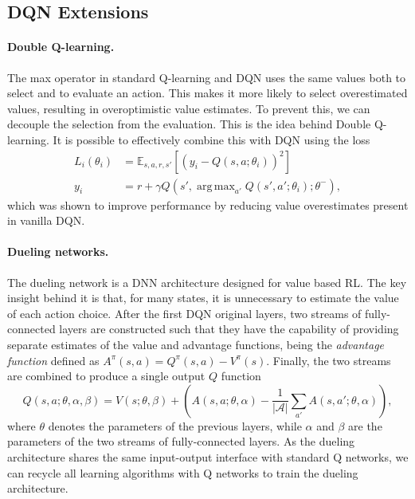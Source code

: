 \documentclass{article}
\DeclareMathOperator*{\argmax}{arg\,max}
\begin{document}
    \subsection{DQN Extensions}
    \label{subsec:extensions}

    \paragraph{Double Q-learning.}
    The max operator in standard Q-learning and DQN uses the same values both to select and to evaluate an action.
    This makes it more likely to select overestimated values, resulting in overoptimistic value estimates.
    To prevent this, we can decouple the selection from the evaluation.
    This is the idea behind Double Q-learning.
    It is possible to effectively combine this with DQN using the loss
    \begin{align}
        L_{i}(\theta_{i}) &= \mathbb{E}_{s, a, r, s'} \left[ \left( y_{i} - Q(s, a; \theta_{i}) \right)^2 \right] \\
        y_{i} &= r + \gamma Q(s', \argmax_{a'} Q(s', a'; \theta_{i}); \theta^{-}),
    \end{align}
    which was shown to improve performance by reducing value overestimates present in vanilla DQN.

    \paragraph{Dueling networks.}
    The dueling network is a DNN architecture designed for value based RL.
    The key insight behind it is that, for many states, it is unnecessary to estimate the value of each action choice.
    After the first DQN original layers, two streams of fully-connected layers are constructed such that they have the capability of providing separate estimates of the value and advantage functions, being the \emph{advantage function} defined as $A^{\pi}(s, a) = Q^{\pi}(s, a) - V^{\pi}(s)$.
    Finally, the two streams are combined to produce a single output $Q$ function
    \begin{equation}
        Q(s, a; \theta, \alpha, \beta) = V(s; \theta, \beta) + \left( A(s, a; \theta, \alpha) - \frac{1}{|\mathcal{A}|} \sum_{a'} A(s, a'; \theta, \alpha) \right),
    \end{equation}
    where $\theta$ denotes the parameters of the previous layers, while $\alpha$ and $\beta$ are the parameters of the two streams of fully-connected layers.
    As the dueling architecture shares the same input-output interface with standard Q networks, we can recycle all learning algorithms with Q networks to train the dueling architecture.
\end{document}

